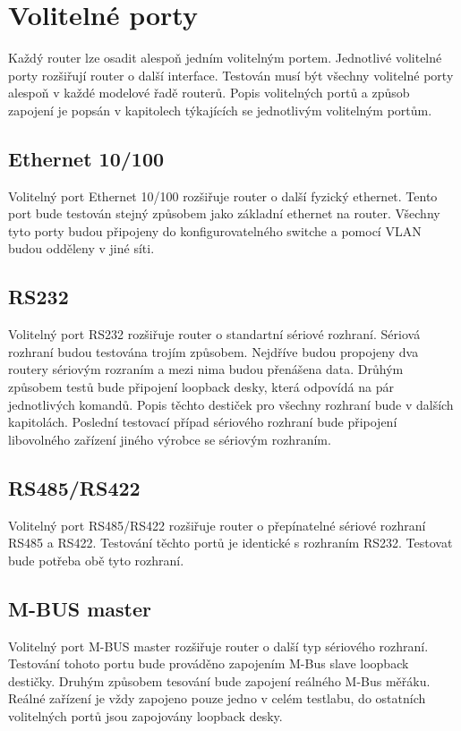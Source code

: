 \section{Volitelné porty}
Každý router lze osadit alespoň jedním volitelným portem. Jednotlivé volitelné porty rozšiřují router o další interface. Testován musí být všechny volitelné porty alespoň v každé modelové řadě routerů. Popis volitelných portů a způsob zapojení je popsán v kapitolech týkajících se jednotlivým volitelným portům.

\subsection{Ethernet 10/100}
Volitelný port Ethernet 10/100 rozšiřuje router o další fyzický ethernet. Tento port bude testován stejný způsobem jako základní ethernet na router. Všechny tyto porty budou připojeny do konfigurovatelného switche a pomocí VLAN budou odděleny v jiné síti.

\subsection{RS232}
Volitelný port RS232 rozšiřuje router o standartní sériové rozhraní. Sériová rozhraní budou testována trojím způsobem. Nejdříve budou propojeny dva routery sériovým rozraním a mezi nima budou přenášena data. Drůhým způsobem testů bude připojení loopback desky, která odpovídá na pár jednotlivých komandů. Popis těchto destiček pro všechny rozhraní bude v dalších kapitolách. Poslední testovací případ sériového rozhraní bude připojení libovolného zařízení jiného výrobce se sériovým rozhraním.

\subsection{RS485/RS422}
Volitelný port RS485/RS422 rozšiřuje router o přepínatelné sériové rozhraní RS485 a RS422. Testování těchto portů je identické s rozhraním RS232. Testovat bude potřeba obě tyto rozhraní.

\subsection{M-BUS master}
Volitelný port M-BUS master rozšiřuje router o další typ sériového rozhraní. Testování tohoto portu bude prováděno zapojením M-Bus slave loopback destičky. Druhým způsobem tesování bude zapojení reálného M-Bus měřáku. Reálné zařízení je vždy zapojeno pouze jedno v celém testlabu, do ostatních volitelných portů jsou zapojovány loopback desky.

